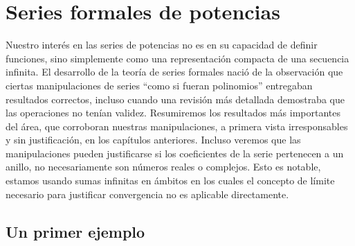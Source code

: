 %

\chapter{Series formales de potencias}
\label{cha:series-formales}

  Nuestro interés en las series de potencias%
  no es en su capacidad de definir funciones,
  sino simplemente como una representación compacta
  de una secuencia infinita.
  El desarrollo de la teoría de series formales
  nació de la observación que ciertas manipulaciones de series
  ``como si fueran polinomios''
  entregaban resultados correctos,
  incluso cuando una revisión más detallada demostraba
  que las operaciones no tenían validez.
  Resumiremos los resultados más importantes del área,
  que corroboran nuestras manipulaciones,
  a primera vista irresponsables y sin justificación,
  en los capítulos anteriores.
  Incluso veremos que las manipulaciones pueden justificarse
  si los coeficientes de la serie pertenecen a un anillo,
  no necesariamente son números reales o complejos.
  Esto es notable,
  estamos usando sumas infinitas
  en ámbitos en los cuales el concepto de límite
  necesario para justificar convergencia
  no es aplicable directamente.

\section{Un primer ejemplo}
\label{sec:un-primer-ejemplo}

